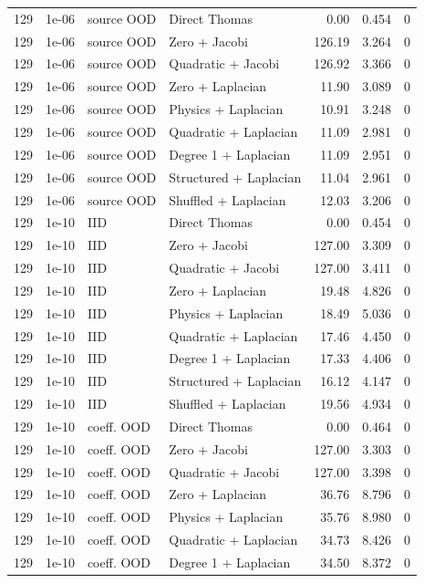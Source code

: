 \begin{longtable}{rlllrrr}
129 & 1e-06 & source OOD & Direct Thomas & 0.00 & 0.454 & 0 \\
129 & 1e-06 & source OOD & Zero + Jacobi & 126.19 & 3.264 & 0 \\
129 & 1e-06 & source OOD & Quadratic + Jacobi & 126.92 & 3.366 & 0 \\
129 & 1e-06 & source OOD & Zero + Laplacian & 11.90 & 3.089 & 0 \\
129 & 1e-06 & source OOD & Physics + Laplacian & 10.91 & 3.248 & 0 \\
129 & 1e-06 & source OOD & Quadratic + Laplacian & 11.09 & 2.981 & 0 \\
129 & 1e-06 & source OOD & Degree 1 + Laplacian & 11.09 & 2.951 & 0 \\
129 & 1e-06 & source OOD & Structured + Laplacian & 11.04 & 2.961 & 0 \\
129 & 1e-06 & source OOD & Shuffled + Laplacian & 12.03 & 3.206 & 0 \\
129 & 1e-10 & IID & Direct Thomas & 0.00 & 0.454 & 0 \\
129 & 1e-10 & IID & Zero + Jacobi & 127.00 & 3.309 & 0 \\
129 & 1e-10 & IID & Quadratic + Jacobi & 127.00 & 3.411 & 0 \\
129 & 1e-10 & IID & Zero + Laplacian & 19.48 & 4.826 & 0 \\
129 & 1e-10 & IID & Physics + Laplacian & 18.49 & 5.036 & 0 \\
129 & 1e-10 & IID & Quadratic + Laplacian & 17.46 & 4.450 & 0 \\
129 & 1e-10 & IID & Degree 1 + Laplacian & 17.33 & 4.406 & 0 \\
129 & 1e-10 & IID & Structured + Laplacian & 16.12 & 4.147 & 0 \\
129 & 1e-10 & IID & Shuffled + Laplacian & 19.56 & 4.934 & 0 \\
129 & 1e-10 & coeff. OOD & Direct Thomas & 0.00 & 0.464 & 0 \\
129 & 1e-10 & coeff. OOD & Zero + Jacobi & 127.00 & 3.303 & 0 \\
129 & 1e-10 & coeff. OOD & Quadratic + Jacobi & 127.00 & 3.398 & 0 \\
129 & 1e-10 & coeff. OOD & Zero + Laplacian & 36.76 & 8.796 & 0 \\
129 & 1e-10 & coeff. OOD & Physics + Laplacian & 35.76 & 8.980 & 0 \\
129 & 1e-10 & coeff. OOD & Quadratic + Laplacian & 34.73 & 8.426 & 0 \\
129 & 1e-10 & coeff. OOD & Degree 1 + Laplacian & 34.50 & 8.372 & 0 \\

\end{longtable}
